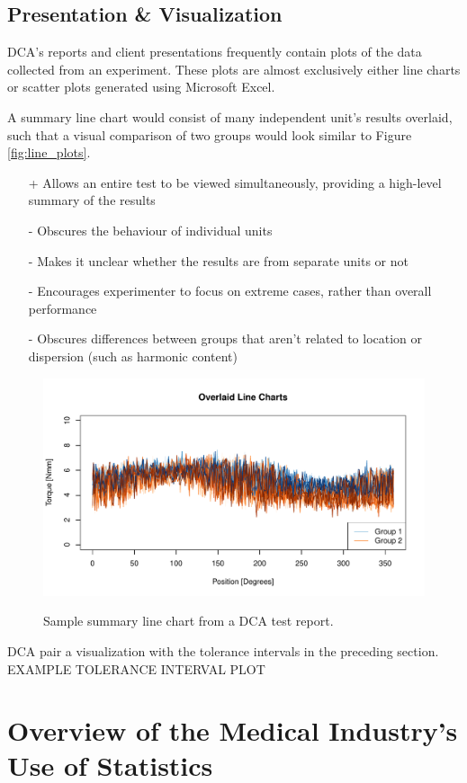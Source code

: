 \documentclass[11pt,a4paper,article]{memoir} %
\begin{document}
\section{Presentation \& Visualization}
DCA's reports and client presentations frequently contain plots of the data collected from an experiment. These plots are almost exclusively either line charts or scatter plots generated using Microsoft Excel. 
\par
A summary line chart would consist of many independent unit's results overlaid, such that a visual comparison of two groups would look similar to Figure \ref{fig:line_plots}.
\begin{itemize}
\item[+] Allows an entire test to be viewed simultaneously, providing a high-level summary of the results
\item[-] Obscures the behaviour of individual units
\item[-] Makes it unclear whether the results are from separate units or not
\item[-] Encourages experimenter to focus on extreme cases, rather than overall performance
\item[-] Obscures differences between groups that aren't related to location or dispersion (such as harmonic content)
\end{itemize}
\begin{figure}[b!]
	\includegraphics[width=\textwidth]{overlaid_line_charts.pdf}
	\label{line_plots}
	\caption{Sample summary line chart from a DCA test report.}
\end{figure}
DCA pair a visualization with the tolerance intervals in the preceding section.
EXAMPLE TOLERANCE INTERVAL PLOT

\chapter{Overview of the Medical Industry's Use of Statistics}\label{industry_context} %
\end{document}
